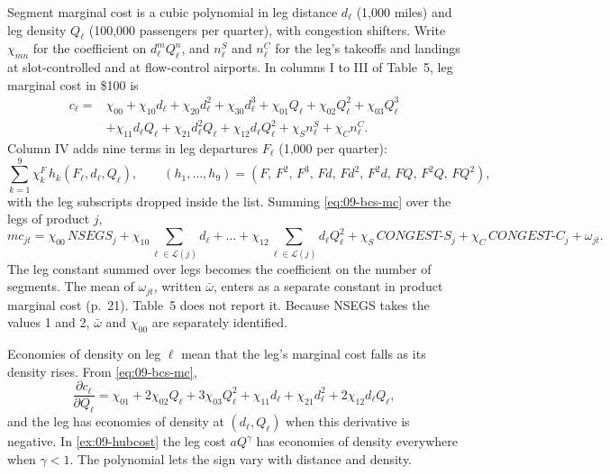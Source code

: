 Segment marginal cost is a cubic polynomial in leg distance $d_\ell$ (1,000 miles) and leg density $Q_\ell$
(100,000 passengers per quarter), with congestion shifters. Write $\chi_{mn}$ for the coefficient on
$d_\ell^mQ_\ell^n$, and $n^S_\ell$ and $n^C_\ell$ for the leg's takeoffs and landings at slot-controlled and
at flow-control airports. In columns I to III of Table~5, leg marginal cost in \$100 is
\begin{equation}\label{eq:09-bcs-mc}
\begin{aligned}
c_\ell={}&\chi_{00}+\chi_{10}d_\ell+\chi_{20}d_\ell^2+\chi_{30}d_\ell^3
+\chi_{01}Q_\ell+\chi_{02}Q_\ell^2+\chi_{03}Q_\ell^3\\
&+\chi_{11}d_\ell Q_\ell+\chi_{21}d_\ell^2Q_\ell+\chi_{12}d_\ell Q_\ell^2
+\chi_S n^S_\ell+\chi_C n^C_\ell .
\end{aligned}
\end{equation}
Column IV adds nine terms in leg departures $F_\ell$ (1,000 per quarter):
\begin{equation}\label{eq:09-bcs-mc-trips}
\sum_{k=1}^{9}\chi^F_k\,h_k(F_\ell,d_\ell,Q_\ell),\qquad
(h_1,\dots,h_9)=(F,\,F^2,\,F^3,\,Fd,\,Fd^2,\,F^2d,\,FQ,\,F^2Q,\,FQ^2),
\end{equation}
with the leg subscripts dropped inside the list. Summing \eqref{eq:09-bcs-mc} over the legs of product $j$,
\begin{equation}\label{eq:09-bcs-mc-product}
mc_{jt}=\chi_{00}\,\mathit{NSEGS}_j+\chi_{10}\sum_{\ell\in\mathcal{L}(j)}d_\ell
+\dots+\chi_{12}\sum_{\ell\in\mathcal{L}(j)}d_\ell Q_\ell^2
+\chi_S\,\mathit{CONGEST\text{-}S}_j+\chi_C\,\mathit{CONGEST\text{-}C}_j+\omega_{jt}.
\end{equation}
The leg constant summed over legs becomes the coefficient on the number of segments. The mean of
$\omega_{jt}$, written $\bar\omega$, enters as a separate constant in product marginal cost (p.~21). Table~5
does not report it. Because NSEGS takes the values 1 and 2, $\bar\omega$ and $\chi_{00}$ are separately
identified.

Economies of density on leg $\ell$ mean that the leg's marginal cost falls as its density rises. From
\eqref{eq:09-bcs-mc},
\begin{equation}\label{eq:09-bcs-dcdq}
\frac{\partial c_\ell}{\partial Q_\ell}=\chi_{01}+2\chi_{02}Q_\ell+3\chi_{03}Q_\ell^2
+\chi_{11}d_\ell+\chi_{21}d_\ell^2+2\chi_{12}d_\ell Q_\ell ,
\end{equation}
and the leg has economies of density at $(d_\ell,Q_\ell)$ when this derivative is negative. In
\cref{ex:09-hubcost} the leg cost $aQ^\gamma$ has economies of density everywhere when $\gamma<1$. The
polynomial lets the sign vary with distance and density.

